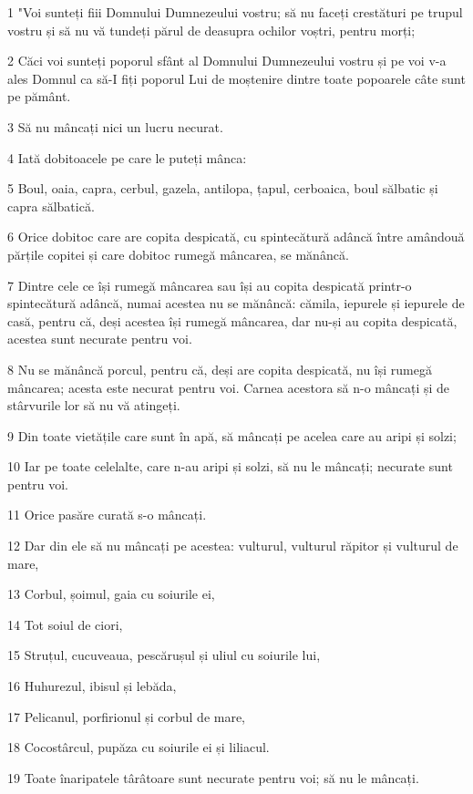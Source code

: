 \par 1 "Voi sunteți fiii Domnului Dumnezeului vostru; să nu faceți crestături pe trupul vostru și să nu vă tundeți părul de deasupra ochilor voștri, pentru morți;
\par 2 Căci voi sunteți poporul sfânt al Domnului Dumnezeului vostru și pe voi v-a ales Domnul ca să-I fiți poporul Lui de moștenire dintre toate popoarele câte sunt pe pământ.
\par 3 Să nu mâncați nici un lucru necurat.
\par 4 Iată dobitoacele pe care le puteți mânca:
\par 5 Boul, oaia, capra, cerbul, gazela, antilopa, țapul, cerboaica, boul sălbatic și capra sălbatică.
\par 6 Orice dobitoc care are copita despicată, cu spintecătură adâncă între amândouă părțile copitei și care dobitoc rumegă mâncarea, se mănâncă.
\par 7 Dintre cele ce își rumegă mâncarea sau își au copita despicată printr-o spintecătură adâncă, numai acestea nu se mănâncă: cămila, iepurele și iepurele de casă, pentru că, deși acestea își rumegă mâncarea, dar nu-și au copita despicată, acestea sunt necurate pentru voi.
\par 8 Nu se mănâncă porcul, pentru că, deși are copita despicată, nu își rumegă mâncarea; acesta este necurat pentru voi. Carnea acestora să n-o mâncați și de stârvurile lor să nu vă atingeți.
\par 9 Din toate vietățile care sunt în apă, să mâncați pe acelea care au aripi și solzi;
\par 10 Iar pe toate celelalte, care n-au aripi și solzi, să nu le mâncați; necurate sunt pentru voi.
\par 11 Orice pasăre curată s-o mâncați.
\par 12 Dar din ele să nu mâncați pe acestea: vulturul, vulturul răpitor și vulturul de mare,
\par 13 Corbul, șoimul, gaia cu soiurile ei,
\par 14 Tot soiul de ciori,
\par 15 Struțul, cucuveaua, pescărușul și uliul cu soiurile lui,
\par 16 Huhurezul, ibisul și lebăda,
\par 17 Pelicanul, porfirionul și corbul de mare,
\par 18 Cocostârcul, pupăza cu soiurile ei și liliacul.
\par 19 Toate înaripatele târâtoare sunt necurate pentru voi; să nu le mâncați.
